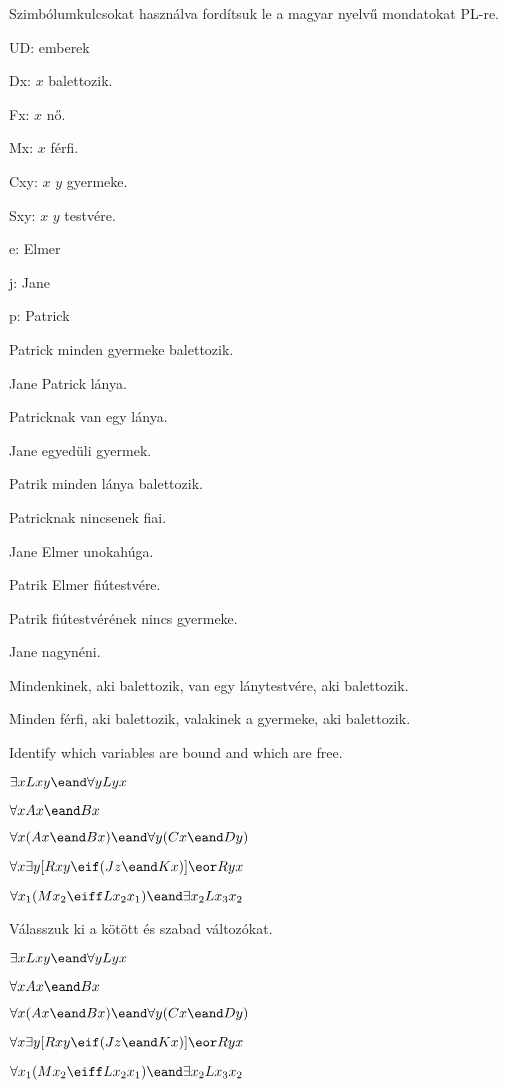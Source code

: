 \problempart
\label{pr.QLballet}
Szimbólumkulcsokat használva fordítsuk le a magyar nyelvű mondatokat PL-re.
\begin{ekey}
\item[UD:] emberek
\item[Dx:] $x$ balettozik.
\item[Fx:] $x$ nő.
\item[Mx:] $x$ férfi.
\item[Cxy:] $x$ $y$ gyermeke.
\item[Sxy:] $x$ $y$ testvére.
\item[e:] Elmer
\item[j:] Jane
\item[p:] Patrick
\end{ekey}
\begin{earg}
\item Patrick minden gyermeke balettozik.
\item Jane Patrick lánya.
\item Patricknak van egy lánya.
\item Jane egyedüli gyermek.
\item Patrik minden lánya balettozik.
\item Patricknak nincsenek fiai.
\item Jane Elmer unokahúga.
\item Patrik Elmer fiútestvére.
\item Patrik fiútestvérének nincs gyermeke.
\item Jane nagynéni.
\item Mindenkinek, aki balettozik, van egy lánytestvére, aki balettozik.
\item Minden férfi, aki balettozik, valakinek a gyermeke, aki balettozik.
\end{earg}

\problempart
\label{pr.freeQL}
Identify which variables are bound and which are free.
\begin{earg}
\item $\exists x Lxy \eand \forall y Lyx$
\item $\forall x Ax \eand Bx$
\item $\forall x (Ax \eand Bx) \eand \forall y(Cx \eand Dy)$
\item $\forall x\exists y[Rxy \eif (Jz \eand Kx)] \eor Ryx$
\item $\forall x_1(Mx_2 \eiff Lx_2x_1) \eand \exists x_2 Lx_3x_2$
\end{earg}

\problempart
\label{pr.freeQL}
Válasszuk ki a kötött és szabad változókat.
\begin{earg}
\item $\exists x Lxy \eand \forall y Lyx$
\item $\forall x Ax \eand Bx$
\item $\forall x (Ax \eand Bx) \eand \forall y(Cx \eand Dy)$
\item $\forall x\exists y[Rxy \eif (Jz \eand Kx)] \eor Ryx$
\item $\forall x_1(Mx_2 \eiff Lx_2x_1) \eand \exists x_2 Lx_3x_2$
\end{earg}

